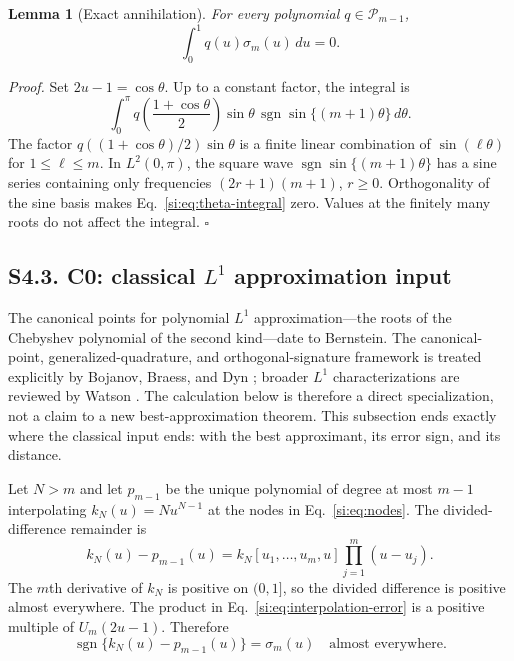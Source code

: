 \documentclass[10pt,twocolumn]{article}
\newtheorem{lemma}{Lemma}
\newcommand{\cP}{\mathcal P}
\newcommand{\sgn}{\operatorname{sgn}}
\begin{document}
\begin{lemma}[Exact annihilation]
\label{si:lem:annihilation}
For every polynomial $q\in\cP_{m-1}$,
\begin{equation}
\int_0^1q(u)\sigma_m(u)\,du=0.
\label{si:eq:annihilation}
\end{equation}
\end{lemma}

\noindent\textit{Proof.}
Set $2u-1=\cos\theta$. Up to a constant factor, the integral is
\begin{equation}
\int_0^\pi q\!\left(\frac{1+\cos\theta}{2}\right)
\sin\theta\,\sgn\sin\{(m+1)\theta\}\,d\theta.
\label{si:eq:theta-integral}
\end{equation}
The factor $q((1+\cos\theta)/2)\sin\theta$ is a finite linear combination of $\sin(\ell\theta)$ for $1\le\ell\le m$. In $L^2(0,\pi)$, the square wave $\sgn\sin\{(m+1)\theta\}$ has a sine series containing only frequencies $(2r+1)(m+1)$, $r\ge0$. Orthogonality of the sine basis makes Eq.~\ref{si:eq:theta-integral} zero. Values at the finitely many roots do not affect the integral. \hfill$\square$

\subsection*{S4.3. C0: classical $L^1$ approximation input}

The canonical points for polynomial $L^1$ approximation---the roots of the Chebyshev polynomial of the second kind---date to Bernstein. The canonical-point, generalized-quadrature, and orthogonal-signature framework is treated explicitly by Bojanov, Braess, and Dyn \citep[pp.~335--353]{bojanov1986}; broader $L^1$ characterizations are reviewed by Watson \citep[pp.~1--15]{watson2000}. The calculation below is therefore a direct specialization, not a claim to a new best-approximation theorem. This subsection ends exactly where the classical input ends: with the best approximant, its error sign, and its distance.

Let $N>m$ and let $p_{m-1}$ be the unique polynomial of degree at most $m-1$ interpolating $k_N(u)=Nu^{N-1}$ at the nodes in Eq.~\ref{si:eq:nodes}. The divided-difference remainder is
\begin{equation}
k_N(u)-p_{m-1}(u)
=k_N[u_1,\ldots,u_m,u]\prod_{j=1}^m(u-u_j).
\label{si:eq:interpolation-error}
\end{equation}
The $m$th derivative of $k_N$ is positive on $(0,1]$, so the divided difference is positive almost everywhere. The product in Eq.~\ref{si:eq:interpolation-error} is a positive multiple of $U_m(2u-1)$. Therefore
\begin{equation}
\sgn\{k_N(u)-p_{m-1}(u)\}=\sigma_m(u)
\quad\text{almost everywhere}.
\label{si:eq:error-sign}
\end{equation}
\end{document}
